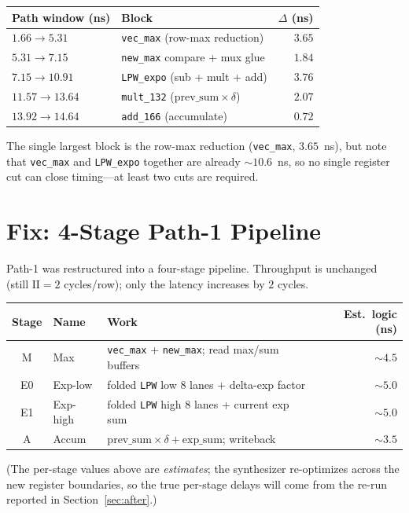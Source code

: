 \documentclass[11pt]{article}
\begin{document}
\begin{center}
\begin{tabular}{llr}
\toprule
Path window (ns) & Block & $\Delta$ (ns) \\
\midrule
$1.66 \to 5.31$  & \texttt{vec\_max} (row-max reduction) & $3.65$ \\
$5.31 \to 7.15$  & \texttt{new\_max} compare + mux glue   & $1.84$ \\
$7.15 \to 10.91$ & \texttt{LPW\_expo} (sub + mult + add)  & $3.76$ \\
$11.57 \to 13.64$& \texttt{mult\_132} ($\text{prev\_sum}\times\delta$) & $2.07$ \\
$13.92 \to 14.64$& \texttt{add\_166} (accumulate)         & $0.72$ \\
\bottomrule
\end{tabular}
\end{center}

The single largest block is the row-max reduction (\texttt{vec\_max},
$3.65$~ns), but note that \texttt{vec\_max} and \texttt{LPW\_expo} together are
already $\sim10.6$~ns, so no single register cut can close timing---at least two
cuts are required.

\section{Fix: 4-Stage Path-1 Pipeline}

Path-1 was restructured into a four-stage pipeline. Throughput is unchanged
(still $\text{II}=2$ cycles/row); only the latency increases by $2$ cycles.

\begin{center}
\begin{tabular}{cllr}
\toprule
Stage & Name & Work & Est.\ logic (ns) \\
\midrule
M  & Max      & \texttt{vec\_max} + \texttt{new\_max}; read max/sum buffers & $\sim4.5$ \\
E0 & Exp-low  & folded \texttt{LPW} low $8$ lanes + delta-exp factor       & $\sim5.0$ \\
E1 & Exp-high & folded \texttt{LPW} high $8$ lanes + current exp sum        & $\sim5.0$ \\
A  & Accum    & $\text{prev\_sum}\times\delta + \text{exp\_sum}$; writeback & $\sim3.5$ \\
\bottomrule
\end{tabular}
\end{center}

\noindent
(The per-stage values above are \emph{estimates}; the synthesizer re-optimizes
across the new register boundaries, so the true per-stage delays will come from
the re-run reported in Section~\ref{sec:after}.)
\end{document}
